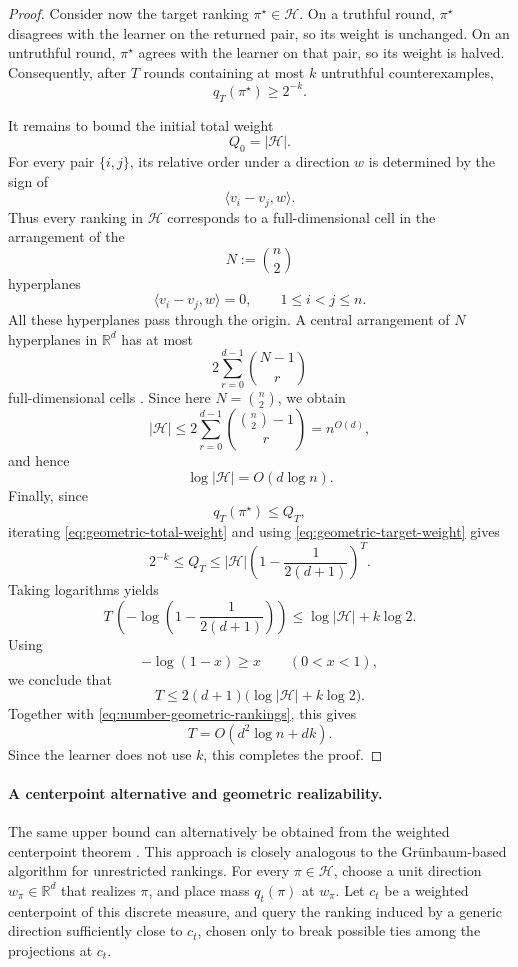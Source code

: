 \documentclass[11pt]{article}
\theoremstyle{definition}
\theoremstyle{remark}
\begin{document}
\begin{proof}
Consider now the target ranking $\pi^\star\in\mathcal H$. On a truthful
round, $\pi^\star$ disagrees with the learner on the returned pair, so its
weight is unchanged. On an untruthful round, $\pi^\star$ agrees with the
learner on that pair, so its weight is halved. Consequently, after $T$
rounds containing at most $k$ untruthful counterexamples,
\[
    q_T(\pi^\star)\geq 2^{-k}.
    \tag{19}\label{eq:geometric-target-weight}
\]

It remains to bound the initial total weight
\[
    Q_0=|\mathcal H|.
\]
For every pair $\{i,j\}$, its relative order under a direction $w$ is
determined by the sign of
\[
    \langle v_i-v_j,w\rangle.
\]
Thus every ranking in $\mathcal H$ corresponds to a full-dimensional cell
in the arrangement of the
\[
    N:=\binom n2
\]
hyperplanes
\[
    \langle v_i-v_j,w\rangle=0,
    \qquad 1\leq i<j\leq n.
\]
All these hyperplanes pass through the origin. A central arrangement of $N$ hyperplanes in $\mathbb R^d$ has at most
\[
    2\sum_{r=0}^{d-1}\binom{N-1}{r}
\]
full-dimensional cells \cite{Matousek2002}. Since here
$N=\binom n2$, we obtain
\[
    |\mathcal H|
    \leq
    2\sum_{r=0}^{d-1}
        \binom{\binom n2-1}{r}
    = n^{O(d)},
\]
and hence
\[
    \log|\mathcal H|=O(d\log n).
    \tag{20}\label{eq:number-geometric-rankings}
\]
Finally, since
\[
    q_T(\pi^\star)\leq Q_T,
\]
iterating \eqref{eq:geometric-total-weight} and using
\eqref{eq:geometric-target-weight} gives
\[
    2^{-k}
    \leq
    Q_T
    \leq
    |\mathcal H|
    \left(
        1-\frac{1}{2(d+1)}
    \right)^T.
\]
Taking logarithms yields
\[
    T\,
    \left(
        -\log\left(
            1-\frac{1}{2(d+1)}
        \right)
    \right)
    \leq
    \log|\mathcal H|+k\log 2.
\]
Using
\[
    -\log(1-x)\geq x
    \qquad (0<x<1),
\]
we conclude that
\[
    T
    \leq
    2(d+1)
    \bigl(
        \log|\mathcal H|+k\log2
    \bigr).
\]
Together with \eqref{eq:number-geometric-rankings}, this gives
\[
    T
    =
    O(d^2\log n+dk).
\]
Since the learner does not use $k$, this completes the proof.
\end{proof}

\paragraph{A centerpoint alternative and geometric realizability.}
The same upper bound can alternatively be obtained from the weighted
centerpoint theorem \cite{Matousek2002}. This approach is closely analogous
to the Gr\"unbaum-based algorithm for unrestricted rankings. For every
$\pi\in\mathcal H$, choose a unit direction
$w_\pi\in\mathbb R^d$ that realizes $\pi$, and place mass $q_t(\pi)$ at
$w_\pi$. Let $c_t$ be a weighted centerpoint of this discrete measure, and query the
ranking induced by a generic direction sufficiently close to $c_t$, chosen
only to break possible ties among the projections at $c_t$.
\end{document}
